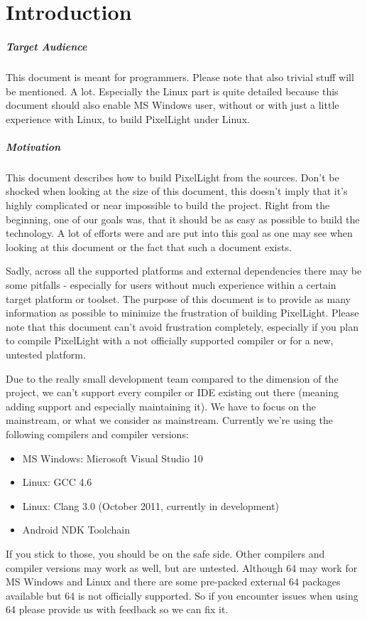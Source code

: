 \chapter{Introduction}


\paragraph{Target Audience}
This document is meant for programmers. Please note that also trivial stuff will be mentioned. A lot. Especially the Linux part is quite detailed because this document should also enable \ac{MS} Windows user, without or with just a little experience with Linux, to build PixelLight under Linux.


\paragraph{Motivation}
This document describes how to build PixelLight from the sources. Don't be shocked when looking at the size of this document, this doesn't imply that it's highly complicated or near impossible to build the project. Right from the beginning, one of our goals was, that it should be as easy as possible to build the technology. A lot of efforts were and are put into this goal as one may see when looking at this document or the fact that such a document exists.

Sadly, across all the supported platforms and external dependencies there may be some pitfalls - especially for users without much experience within a certain target platform or toolset. The purpose of this document is to provide as many information as possible to minimize the frustration of building PixelLight. Please note that this document can't avoid frustration completely, especially if you plan to compile PixelLight with a not officially supported compiler or for a new, untested platform.

Due to the really small development team compared to the dimension of the project, we can't support every compiler or \ac{IDE} existing out there (meaning adding support and especially maintaining it). We have to focus on the mainstream, or what we consider as mainstream. Currently we're using the following compilers and compiler versions:
\begin{itemize}
\item{\ac{MS} Windows: Microsoft Visual Studio 10}
\item{Linux: \ac{GCC} 4.6}
\item{Linux: Clang 3.0 (October 2011, currently in development)}
\item{Android \ac{NDK} Toolchain}
\end{itemize}
If you stick to those, you should be on the safe side. Other compilers and compiler versions may work as well, but are untested. Although \SI{64}{\bit} may work for \ac{MS} Windows and Linux and there are some pre-packed external \SI{64}{\bit} packages available but \SI{64}{\bit} is not officially supported. So if you encounter issues when using \SI{64}{\bit} please provide us with feedback so we can fix it.

